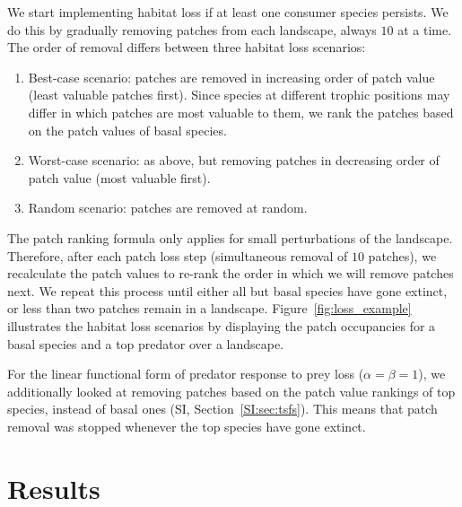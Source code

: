 \documentclass[11pt]{article}
\newcommand{\SI}{SI}
\begin{document}
We start implementing habitat loss if at least one consumer species persists. We do this by gradually removing patches from each landscape, always $10$ at a time. The order of removal differs between three habitat loss scenarios:
\begin{enumerate}
\item Best-case scenario: patches are removed in increasing order of patch value (least valuable patches first). Since species at different trophic positions may differ in which patches are most valuable to them, we rank the patches based on the patch values of basal species.
\item Worst-case scenario: as above, but removing patches in decreasing order of patch value (most valuable first).
\item Random scenario: patches are removed at random.
\end{enumerate}
The patch ranking formula only applies for small perturbations of the landscape. Therefore, after each patch loss step (simultaneous removal of $10$ patches), we recalculate the patch values to re-rank the order in which we will remove patches next. We repeat this process until either all but basal species have gone extinct, or less than two patches remain in a landscape. Figure~\ref{fig:loss_example} illustrates the habitat loss scenarios by displaying the patch occupancies for a basal species and a top predator over a landscape.

For the linear functional form of predator response to prey loss ($\alpha = \beta = 1$), we additionally looked at removing patches based on the patch value rankings of top species, instead of basal ones (\SI, Section~\ref{SI:sec:tsfs}). This means that patch removal was stopped whenever the top species have gone extinct.


\section{Results} \label{sec:results}
\end{document}
